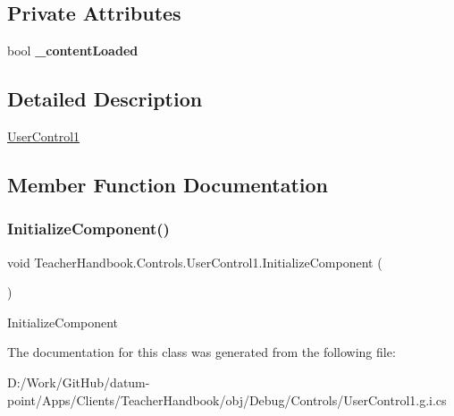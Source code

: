 \subsection*{Private Attributes}
\begin{DoxyCompactItemize}
\item 
\mbox{\label{class_teacher_handbook_1_1_controls_1_1_user_control1_a57070769f7910e144693661a022177be}} 
bool {\bfseries \+\_\+content\+Loaded}
\end{DoxyCompactItemize}


\subsection{Detailed Description}
\mbox{\hyperlink{class_teacher_handbook_1_1_controls_1_1_user_control1}{User\+Control1}} 



\subsection{Member Function Documentation}
\mbox{\label{class_teacher_handbook_1_1_controls_1_1_user_control1_afbcb7046a6000b1f69c161bb9e5c69b2}} 
\subsubsection{\texorpdfstring{Initialize\+Component()}{InitializeComponent()}}
{\footnotesize\ttfamily void Teacher\+Handbook.\+Controls.\+User\+Control1.\+Initialize\+Component (\begin{DoxyParamCaption}{ }\end{DoxyParamCaption})}



Initialize\+Component 



The documentation for this class was generated from the following file\+:\begin{DoxyCompactItemize}
\item 
D\+:/\+Work/\+Git\+Hub/datum-\/point/\+Apps/\+Clients/\+Teacher\+Handbook/obj/\+Debug/\+Controls/User\+Control1.\+g.\+i.\+cs\end{DoxyCompactItemize}
